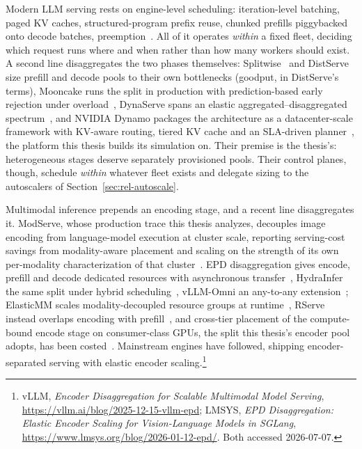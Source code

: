 Modern LLM serving rests on engine-level scheduling: iteration-level
batching, paged KV caches, structured-program prefix reuse, chunked
prefills piggybacked onto decode batches,
preemption~\cite{Yu2022Orca,Kwon2023vLLM,Zheng2024SGLang,Agrawal2024SarathiServe,Wu2023FastServe}.
All of it operates \emph{within} a fixed fleet, deciding which request
runs where and when rather than how many workers should exist. A second
line disaggregates the
two phases themselves: Splitwise~\cite{Patel2024Splitwise} and
DistServe~\cite{Zhong2024DistServe} size prefill and decode pools to
their own bottlenecks (goodput, in DistServe's terms), Mooncake runs the
split in production with prediction-based early rejection under
overload~\cite{Qin2025Mooncake}, DynaServe spans an elastic
aggregated--disaggregated spectrum~\cite{Ruan2025DynaServe}, and NVIDIA
Dynamo packages the architecture as a datacenter-scale framework with
KV-aware routing, tiered KV cache and an SLA-driven
planner~\cite{Dynamo2025}, the platform this thesis builds its
simulation on. Their premise is the thesis's: heterogeneous stages
deserve separately provisioned pools. Their control planes, though,
schedule \emph{within} whatever fleet exists and delegate sizing to the
autoscalers of Section~\ref{sec:rel-autoscale}.

\label{sec:rel-mm}
Multimodal inference prepends an encoding stage, and a recent line
disaggregates it. ModServe, whose production trace this thesis analyzes,
decouples image encoding from language-model execution at cluster scale,
reporting serving-cost savings from modality-aware placement and scaling
on the strength of its own per-modality characterization of that
cluster~\cite{Qiu2025ModServe}. EPD disaggregation gives encode, prefill
and decode dedicated resources with asynchronous
transfer~\cite{Singh2025EPD}, HydraInfer the same split under hybrid
scheduling~\cite{Dong2025HydraInfer}, vLLM-Omni an any-to-any
extension~\cite{vLLMOmni2026}; ElasticMM scales modality-decoupled
resource groups at runtime~\cite{Liu2025ElasticMM}, RServe instead
overlaps encoding with prefill~\cite{Guo2025RServe}, and cross-tier
placement of the compute-bound encode stage on consumer-class GPUs,
the split this thesis's encoder pool adopts, has been
costed~\cite{Yu2026HeteroServe}. Mainstream engines have followed,
shipping encoder-separated serving with elastic encoder
scaling.\footnote{vLLM, \emph{Encoder Disaggregation for Scalable
Multimodal Model Serving},
\url{https://vllm.ai/blog/2025-12-15-vllm-epd}; LMSYS, \emph{EPD
Disaggregation: Elastic Encoder Scaling for Vision-Language Models in
SGLang}, \url{https://www.lmsys.org/blog/2026-01-12-epd/}. Both accessed
2026-07-07.}

